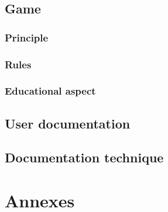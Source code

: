 \documentclass{tnreport}
\begin{document}
\chapter{Game}

\section{Principle}

\section{Rules}

\section{Educational aspect}

\chapter{User documentation}

\chapter{Documentation technique}

\appendix
\part*{Annexes}
\end{document}
